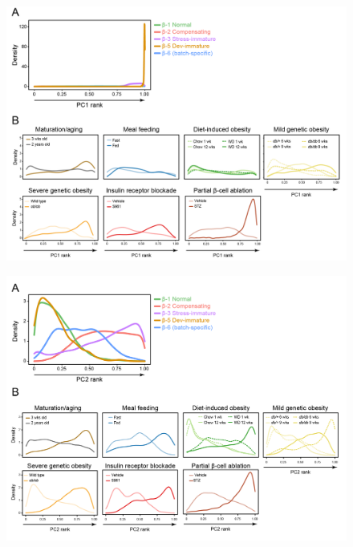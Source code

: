 \begin{figure}[H]
\centering
\includegraphics[width=\linewidth]{Appendix2/Fig/F3-7-02.png}
\caption[Loss of β-cell maturity across studies along PC1]{}
\label{suppl_fig:chp3_pc1}
\end{figure}


\begin{figure}[H]
\centering
\includegraphics[width=\linewidth]{Appendix2/Fig/F3-7-03.png}
\caption[Increased β-cell workload across studies along PC2]{}
\label{suppl_fig:chp3_pc2}
\end{figure}

